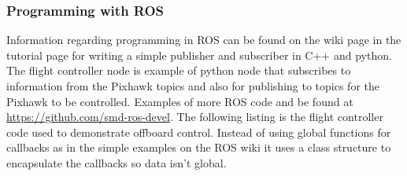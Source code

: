 \subsubsection{Programming with ROS}
Information regarding programming in ROS can be found on the wiki page in the tutorial page for writing a simple publisher and subscriber in C++ and python. The flight controller node is example of python node that subscribes to information from the Pixhawk topics and also for publishing to topics for the Pixhawk to be controlled. Examples of more ROS code and be found at \url{https://github.com/smd-ros-devel}. The following listing is the flight controller code used to demonstrate offboard control. Instead of using global functions for callbacks as in the simple examples on the ROS wiki it uses a class structure to encapsulate the callbacks so data isn't global.

